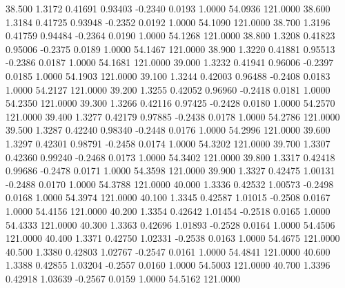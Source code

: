   38.500   1.3172   0.41691   0.93403  -0.2340   0.0193   1.0000  54.0936 121.0000
  38.600   1.3184   0.41725   0.93948  -0.2352   0.0192   1.0000  54.1090 121.0000
  38.700   1.3196   0.41759   0.94484  -0.2364   0.0190   1.0000  54.1268 121.0000
  38.800   1.3208   0.41823   0.95006  -0.2375   0.0189   1.0000  54.1467 121.0000
  38.900   1.3220   0.41881   0.95513  -0.2386   0.0187   1.0000  54.1681 121.0000
  39.000   1.3232   0.41941   0.96006  -0.2397   0.0185   1.0000  54.1903 121.0000
  39.100   1.3244   0.42003   0.96488  -0.2408   0.0183   1.0000  54.2127 121.0000
  39.200   1.3255   0.42052   0.96960  -0.2418   0.0181   1.0000  54.2350 121.0000
  39.300   1.3266   0.42116   0.97425  -0.2428   0.0180   1.0000  54.2570 121.0000
  39.400   1.3277   0.42179   0.97885  -0.2438   0.0178   1.0000  54.2786 121.0000
  39.500   1.3287   0.42240   0.98340  -0.2448   0.0176   1.0000  54.2996 121.0000
  39.600   1.3297   0.42301   0.98791  -0.2458   0.0174   1.0000  54.3202 121.0000
  39.700   1.3307   0.42360   0.99240  -0.2468   0.0173   1.0000  54.3402 121.0000
  39.800   1.3317   0.42418   0.99686  -0.2478   0.0171   1.0000  54.3598 121.0000
  39.900   1.3327   0.42475   1.00131  -0.2488   0.0170   1.0000  54.3788 121.0000
  40.000   1.3336   0.42532   1.00573  -0.2498   0.0168   1.0000  54.3974 121.0000
  40.100   1.3345   0.42587   1.01015  -0.2508   0.0167   1.0000  54.4156 121.0000
  40.200   1.3354   0.42642   1.01454  -0.2518   0.0165   1.0000  54.4333 121.0000
  40.300   1.3363   0.42696   1.01893  -0.2528   0.0164   1.0000  54.4506 121.0000
  40.400   1.3371   0.42750   1.02331  -0.2538   0.0163   1.0000  54.4675 121.0000
  40.500   1.3380   0.42803   1.02767  -0.2547   0.0161   1.0000  54.4841 121.0000
  40.600   1.3388   0.42855   1.03204  -0.2557   0.0160   1.0000  54.5003 121.0000
  40.700   1.3396   0.42918   1.03639  -0.2567   0.0159   1.0000  54.5162 121.0000
